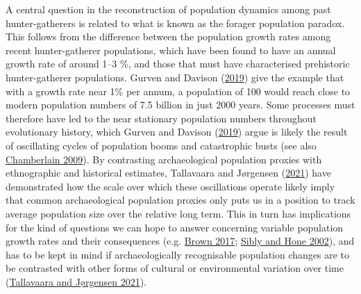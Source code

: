 \documentclass[
  12pt,
  a4paper,
  oneside]{book}
\begin{document}
A central question in the reconstruction of population dynamics among past hunter-gatherers is related to what is known as the forager population paradox. This follows from the difference between the population growth rates among recent hunter-gatherer populations, which have been found to have an annual growth rate of around 1--3 \%, and those that must have characterised prehistoric hunter-gatherer populations. Gurven and Davison (\protect\hyperlink{ref-gurven2019}{2019}) give the example that with a growth rate near 1\% per annum, a population of 100 would reach close to modern population numbers of 7.5 billion in just 2000 years. Some processes must therefore have led to the near stationary population numbers throughout evolutionary history, which Gurven and Davison (\protect\hyperlink{ref-gurven2019}{2019}) argue is likely the result of oscillating cycles of population booms and catastrophic busts (see also \protect\hyperlink{ref-chamberlain2009}{Chamberlain 2009}). By contrasting archaeological population proxies with ethnographic and historical estimates, Tallavaara and Jørgensen (\protect\hyperlink{ref-tallavaara2021}{2021}) have demonstrated how the scale over which these oscillations operate likely imply that common archaeological population proxies only puts us in a position to track average population size over the relative long term. This in turn has implications for the kind of questions we can hope to answer concerning variable population growth rates and their consequences (e.g. \protect\hyperlink{ref-brown2017}{Brown 2017}; \protect\hyperlink{ref-sibly2002}{Sibly and Hone 2002}), and has to be kept in mind if archaeologically recognisable population changes are to be contrasted with other forms of cultural or environmental variation over time (\protect\hyperlink{ref-tallavaara2021}{Tallavaara and Jørgensen 2021}).
\end{document}
